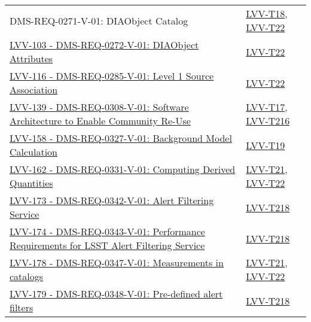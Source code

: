 \begin{longtable}[]{p{13cm}p{3cm}}
{DMS-REQ-0271-V-01: DIAObject Catalog} &
\protect\hyperlink{lvv-t18---ag-00-05-alert-generation-produces-required-data-products}{LVV-T18},
\protect\hyperlink{lvv-t22---ag-00-25-scientific-verification-of-diaobject-catalog}{LVV-T22}\tabularnewline
\href{https://jira.lsstcorp.org/browse/LVV-103}{LVV-103 -
DMS-REQ-0272-V-01: DIAObject Attributes} &
\protect\hyperlink{lvv-t22---ag-00-25-scientific-verification-of-diaobject-catalog}{LVV-T22}\tabularnewline
\href{https://jira.lsstcorp.org/browse/LVV-116}{LVV-116 -
DMS-REQ-0285-V-01: Level 1 Source Association} &
\protect\hyperlink{lvv-t22---ag-00-25-scientific-verification-of-diaobject-catalog}{LVV-T22}\tabularnewline
\href{https://jira.lsstcorp.org/browse/LVV-139}{LVV-139 -
DMS-REQ-0308-V-01: Software Architecture to Enable Community Re-Use} &
\protect\hyperlink{lvv-t17---ag-00-00-installation-of-the-alert-generation-science-payload}{LVV-T17},
\protect\hyperlink{lvv-t216---ad-00-00-installation-of-the-alert-distribution-payloads}{LVV-T216}\tabularnewline
\href{https://jira.lsstcorp.org/browse/LVV-158}{LVV-158 -
DMS-REQ-0327-V-01: Background Model Calculation} &
\protect\hyperlink{lvv-t19---ag-00-10-scientific-verification-of-processed-visit-images}{LVV-T19}\tabularnewline
\href{https://jira.lsstcorp.org/browse/LVV-162}{LVV-162 -
DMS-REQ-0331-V-01: Computing Derived Quantities} &
\protect\hyperlink{lvv-t21---ag-00-20-scientific-verification-of-diasource-catalog}{LVV-T21},
\protect\hyperlink{lvv-t22---ag-00-25-scientific-verification-of-diaobject-catalog}{LVV-T22}\tabularnewline
\href{https://jira.lsstcorp.org/browse/LVV-173}{LVV-173 -
DMS-REQ-0342-V-01: Alert Filtering Service} &
\protect\hyperlink{lvv-t218---ad-00-10-simple-filtering-of-the-lsst-alert-stream}{LVV-T218}\tabularnewline
\href{https://jira.lsstcorp.org/browse/LVV-174}{LVV-174 -
DMS-REQ-0343-V-01: Performance Requirements for LSST Alert Filtering
Service} &
\protect\hyperlink{lvv-t218---ad-00-10-simple-filtering-of-the-lsst-alert-stream}{LVV-T218}\tabularnewline
\href{https://jira.lsstcorp.org/browse/LVV-178}{LVV-178 -
DMS-REQ-0347-V-01: Measurements in catalogs} &
\protect\hyperlink{lvv-t21---ag-00-20-scientific-verification-of-diasource-catalog}{LVV-T21},
\protect\hyperlink{lvv-t22---ag-00-25-scientific-verification-of-diaobject-catalog}{LVV-T22}\tabularnewline
\href{https://jira.lsstcorp.org/browse/LVV-179}{LVV-179 -
DMS-REQ-0348-V-01: Pre-defined alert filters} &
\protect\hyperlink{lvv-t218---ad-00-10-simple-filtering-of-the-lsst-alert-stream}{LVV-T218}\tabularnewline
\bottomrule
\end{longtable}

